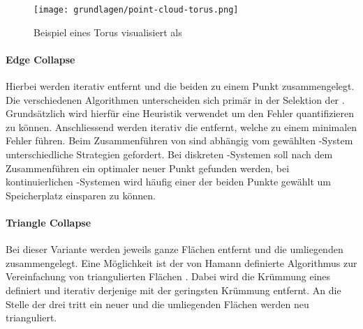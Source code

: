\begin{figure}[H]
  \centering
  \texttt{[image: grundlagen/point-cloud-torus.png]}
  \caption{Beispiel eines Torus visualisiert als  \cite{pointCloudTorus}}
  \label{fig:pointCloudTorus}
\end{figure}

\pagebreak

\paragraph{Edge Collapse}
Hierbei werden iterativ  entfernt und die beiden  zu einem Punkt zusammengelegt.
Die verschiedenen Algorithmen unterscheiden sich primär in der Selektion der . Grundsätzlich wird hierfür eine Heuristik verwendet um den Fehler quantifizieren zu können. Anschliessend werden iterativ die  entfernt, welche zu einem minimalen Fehler führen. Beim Zusammenführen von  sind abhängig vom gewählten -System unterschiedliche Strategien gefordert. Bei diskreten -Systemen soll nach dem Zusammenführen ein optimaler neuer Punkt gefunden werden, bei kontinuierlichen -Systemen wird häufig einer der beiden Punkte gewählt um Speicherplatz einsparen zu können.

\paragraph{Triangle Collapse}
Bei dieser Variante werden jeweils ganze Flächen entfernt und die umliegenden  zusammengelegt. Eine Möglichkeit ist der von Hamann definierte Algorithmus zur Vereinfachung von triangulierten Flächen \cite{triangleCollapseAlgorithm}. Dabei wird die Krümmung eines  definiert und iterativ derjenige  mit der geringsten Krümmung entfernt. An die Stelle der drei  tritt ein neuer  und die umliegenden Flächen werden neu trianguliert.
